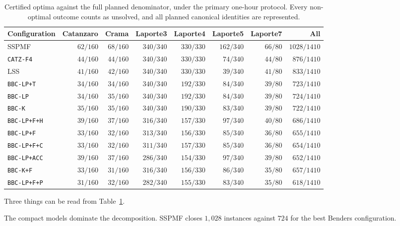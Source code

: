 \begin{table}[t]\centering
\scriptsize
\setlength{\tabcolsep}{4pt}
\begin{tabular}{@{}lrrrrrrr@{}}
\toprule
Configuration & Catanzaro & Crama & Laporte3 & Laporte4 & Laporte5 & Laporte7 & All\\
\midrule
SSPMF              & $62/160$ & $68/160$ & $340/340$ & $330/330$ & $162/340$ & $66/80$ & $1028/1410$\\
\texttt{CATZ-F4}   & $44/160$ & $44/160$ & $340/340$ & $330/330$ & $74/340$  & $44/80$ & $876/1410$\\
LSS                & $41/160$ & $42/160$ & $340/340$ & $330/330$ & $39/340$  & $41/80$ & $833/1410$\\
\midrule
\texttt{BBC-LP+T}  & $34/160$ & $34/160$ & $340/340$ & $192/330$ & $84/340$  & $39/80$ & $723/1410$\\
\texttt{BBC-LP}    & $34/160$ & $35/160$ & $340/340$ & $192/330$ & $84/340$  & $39/80$ & $724/1410$\\
\texttt{BBC-K}     & $35/160$ & $35/160$ & $340/340$ & $190/330$ & $83/340$  & $39/80$ & $722/1410$\\
\texttt{BBC-LP+F+H}& $39/160$ & $37/160$ & $316/340$ & $157/330$ & $97/340$  & $40/80$ & $686/1410$\\
\texttt{BBC-LP+F}  & $33/160$ & $32/160$ & $313/340$ & $156/330$ & $85/340$  & $36/80$ & $655/1410$\\
\texttt{BBC-LP+F+C}& $33/160$ & $32/160$ & $311/340$ & $157/330$ & $85/340$  & $36/80$ & $654/1410$\\
\texttt{BBC-LP+ACC}& $39/160$ & $37/160$ & $286/340$ & $154/330$ & $97/340$  & $39/80$ & $652/1410$\\
\texttt{BBC-K+F}   & $33/160$ & $31/160$ & $316/340$ & $156/330$ & $86/340$  & $35/80$ & $657/1410$\\
\texttt{BBC-LP+F+P}& $31/160$ & $32/160$ & $282/340$ & $155/330$ & $83/340$  & $35/80$ & $618/1410$\\
\bottomrule
\end{tabular}
\caption{Certified optima against the full planned denominator, under the primary
one-hour protocol. Every non-optimal outcome counts as unsolved, and all planned
canonical identities are represented.}
\label{tab:solves}
\end{table}

Three things can be read from Table~\ref{tab:solves}.

The compact models dominate the decomposition. SSPMF closes $1{,}028$ instances against
$724$ for the best Benders configuration.

